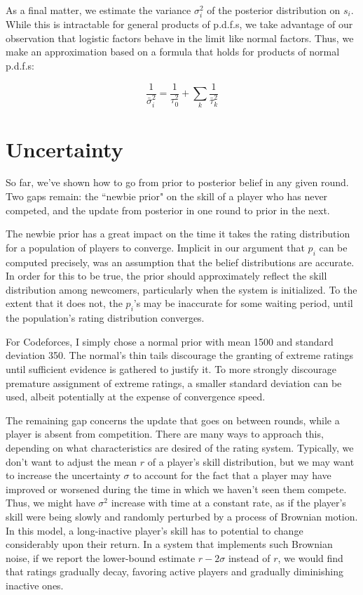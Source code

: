 \documentclass{article}
\begin{document}
As a final matter, we estimate the variance $\sigma_i^2$ of the posterior distribution on $s_i$. While this is intractable for general products of p.d.f.s, we take advantage of our observation that logistic factors behave in the limit like normal factors. Thus, we make an approximation based on a formula that holds for products of normal p.d.f.s:

\[\frac{1}{\bar\sigma_i^2} = \frac{1}{\tau_0^2} + \sum_k \frac{1}{\bar\tau_k^2}\]

\section{Uncertainty}

So far, we've shown how to go from prior to posterior belief in any given round. Two gaps remain: the ``newbie prior" on the skill of a player who has never competed, and the update from posterior in one round to prior in the next.

The newbie prior has a great impact on the time it takes the rating distribution for a population of players to converge. Implicit in our argument that $p_i$ can be computed precisely, was an assumption that the belief distributions are accurate. In order for this to be true, the prior should approximately reflect the skill distribution among newcomers, particularly when the system is initialized. To the extent that it does not, the $p_i$'s may be inaccurate for some waiting period, until the population's rating distribution converges.

For Codeforces, I simply chose a normal prior with mean 1500 and standard deviation 350. The normal's thin tails discourage the granting of extreme ratings until sufficient evidence is gathered to justify it. To more strongly discourage premature assignment of extreme ratings, a smaller standard deviation can be used, albeit potentially at the expense of convergence speed.

The remaining gap concerns the update that goes on between rounds, while a player is absent from competition. There are many ways to approach this, depending on what characteristics are desired of the rating system. Typically, we don't want to adjust the mean $r$ of a player's skill distribution, but we may want to increase the uncertainty $\sigma$ to account for the fact that a player may have improved or worsened during the time in which we haven't seen them compete. Thus, we might have $\sigma^2$ increase with time at a constant rate, as if the player's skill were being slowly and randomly perturbed by a process of Brownian motion. In this model, a long-inactive player's skill has to potential to change considerably upon their return. In a system that implements such Brownian noise, if we report the lower-bound estimate $r-2\sigma$ instead of $r$, we would find that ratings gradually decay, favoring active players and gradually diminishing inactive ones.
\end{document}
